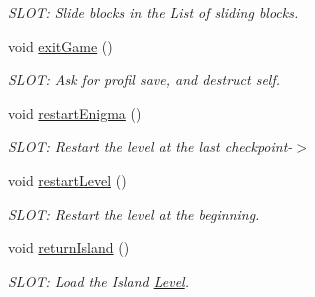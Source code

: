 \begin{DoxyCompactItemize}
\begin{DoxyCompactList}\small\item\em S\+L\+O\+T\+: Slide blocks in the List of sliding blocks. \end{DoxyCompactList}\item 
\hypertarget{class_gameboard_af76ebc877764feed7bc9d90452178f5f}{}void \hyperlink{class_gameboard_af76ebc877764feed7bc9d90452178f5f}{exit\+Game} ()\label{class_gameboard_af76ebc877764feed7bc9d90452178f5f}

\begin{DoxyCompactList}\small\item\em S\+L\+O\+T\+: Ask for profil save, and destruct self. \end{DoxyCompactList}\item 
\hypertarget{class_gameboard_a0de799440eb9030b55bf3f59fa350683}{}void \hyperlink{class_gameboard_a0de799440eb9030b55bf3f59fa350683}{restart\+Enigma} ()\label{class_gameboard_a0de799440eb9030b55bf3f59fa350683}

\begin{DoxyCompactList}\small\item\em S\+L\+O\+T\+: Restart the level at the last checkpoint-\/$>$ \end{DoxyCompactList}\item 
\hypertarget{class_gameboard_a0d4ac38611d2ed24732823656ba613e0}{}void \hyperlink{class_gameboard_a0d4ac38611d2ed24732823656ba613e0}{restart\+Level} ()\label{class_gameboard_a0d4ac38611d2ed24732823656ba613e0}

\begin{DoxyCompactList}\small\item\em S\+L\+O\+T\+: Restart the level at the beginning. \end{DoxyCompactList}\item 
\hypertarget{class_gameboard_a538d797eadaa51a15c999c14f984f76c}{}void \hyperlink{class_gameboard_a538d797eadaa51a15c999c14f984f76c}{return\+Island} ()\label{class_gameboard_a538d797eadaa51a15c999c14f984f76c}

\begin{DoxyCompactList}\small\item\em S\+L\+O\+T\+: Load the Island \hyperlink{class_level}{Level}. \end{DoxyCompactList}\end{DoxyCompactItemize}
